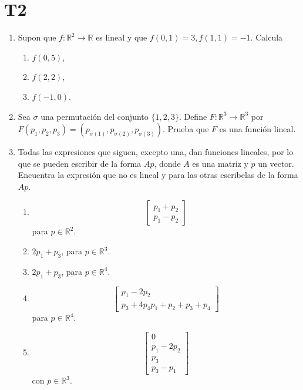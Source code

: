 \documentclass{article}
\theoremstyle{definition}
\begin{document}
  \section*{T2}
  
  \begin{enumerate}
       \item Supon que $f:\mathbb{R}^2 \to \mathbb{R}$ es lineal y que $f(0,1)=3, f(1,1)=-1$. Calcula
       \begin{enumerate}
       \item $f(0,5)$,
       \item $f(2,2)$,
         \item $f(-1,0)$.
       \end{enumerate}

       \item Sea $\sigma$ una permutaci\'on del conjunto $\{1,2,3\}$. Define $F:\mathbb{R}^3\to \mathbb{R}^3$ por
  $F(p_1,p_2,p_3)=(p_{\sigma(1)}, p_{\sigma(2)}, p_{\sigma(3)})$. Prueba que $F$ es una funci\'on lineal.


       \item Todas las expresiones que siguen, excepto una, dan funciones lineales, por lo que se pueden escribir de la forma $Ap$, donde $A$ es una matriz y $p$ un vector. Encuentra la expresi\'on que no es lineal y para las otras  escribelas  de la forma $Ap$.

       
       \begin{enumerate}
       \item 
       $$
       \left[
       \begin{array}{cc}
       p_1+p_2 \\
       p_1-p_2
       \end{array}
       \right]	
       $$
       para $p\in \mathbb{R}^2$.
       \item $2p_1+p_3$, para  $p\in \mathbb{R}^3$.
       \item $2p_1+p_3$, para $p\in \mathbb{R}^4$.
       \item 
       $$
       \left[
       \begin{array}{c}
       p_1-2p_2 \\
       p_3+4p_4
       p_1+p_2+p_3+p_4
       \end{array}
       \right]
       $$
       para $p\in \mathbb{R}^4$.
       
	\item 
	$$
	\left[
	\begin{array}{c}
	0 \\
	p_1-2p_2\\
	p_3 \\
	p_3-p_1
	\end{array}
	\right]
	$$       
       con $p\in\mathbb{R}^3$.
       \end{enumerate}


\end{enumerate}
\end{document}
